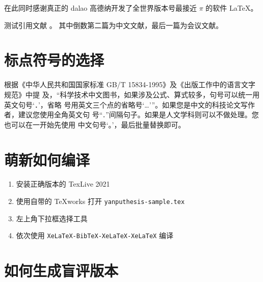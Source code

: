 \documentclass[lang=chs, degree=phd, blindreview=false, winfonts=true, academic=true]{yanputhesis}
\begin{document}
在此同时感谢真正的 dalao 高德纳开发了全世界版本号最接近 $\pi$ 的软件
\LaTeX \cite{knuth1986the}\nocite{lamport1989latex}。

测试引用文献 \cite{szegedy2015going, shen2021peridynamic, chen2014maiyuan, chen2018autonomous}。
其中倒数第二篇为中文文献，最后一篇为会议文献。

\section{标点符号的选择}

根据《中华人民共和国国家标准 GB/T 15834-1995》及《出版工作中的语言文字规范》中提
及，“科学技术中文图书，如果涉及公式、算式较多，句号可以统一用英文句号‘．’，省略
号用英文三个点的省略号‘…’”。如果您是中文的科技论文写作者，建议您使用全角英文句
号“\lstinline`．`”间隔句子。如果是人文学科则可以不做处理。您也可以在一开始先使用
中文句号‘。’，最后批量替换即可。

\section{萌新如何编译}

\begin{enumerate}
    \setlength{\itemsep}{0pt}
    \item 安装正确版本的 TexLive 2021
    \item 使用自带的 TeXworks 打开 \lstinline`yanputhesis-sample.tex`
    \item 左上角下拉框选择工具
    \item 依次使用 \lstinline`XeLaTeX-BibTeX-XeLaTeX-XeLaTeX` 编译
\end{enumerate}

\section{如何生成盲评版本}
\end{document}
